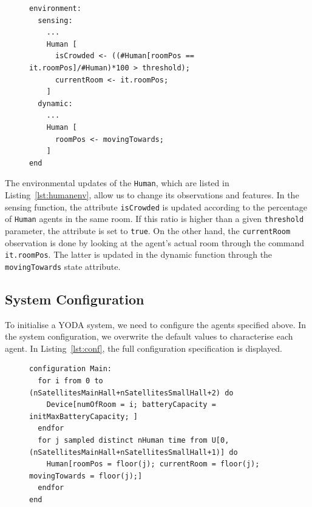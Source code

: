 \documentclass[runningheads]{llncs}
\newcommand{\yoda}{\textsf{YODA}}
\begin{document}
\begin{figure}[htbp!]
\begin{lstlisting}[language=yoda,basicstyle=\scriptsize, caption={IAQ Scenario: \textsf{Human} Sensing and Dynamic Functions}, label={lst:humanenv}]
environment:
  sensing:
    ...
    Human [
      isCrowded <- ((#Human[roomPos == it.roomPos]/#Human)*100 > threshold);
      currentRoom <- it.roomPos;
    ]
  dynamic:
    ...
    Human [
      roomPos <- movingTowards;
    ]
end
\end{lstlisting}
\end{figure}

The environmental updates of the \lstinline{Human}, which are listed in Listing~\ref{lst:humanenv}, allow us to change its observations and features.
%
In the sensing function, the attribute \lstinline{isCrowded} is updated according to the percentage of \lstinline{Human} agents in the same room. If this ratio is higher than a given \lstinline{threshold} parameter, the attribute is set to \lstinline{true}.
%
On the other hand, the \lstinline{currentRoom} observation is done by looking at the agent's actual room through the command \lstinline{it.roomPos}.
%
The latter is updated in the dynamic function through the \lstinline{movingTowards} state attribute.

\subsection{System Configuration}\label{subsec:sysconf}

To initialise a \yoda{} system, we need to configure the agents specified above.
%
In the system configuration, we overwrite the default values to characterise each agent.
%
In Listing~\ref{lst:conf}, the full configuration specification is displayed.

\begin{figure}[htbp!]
\begin{lstlisting}[language=yoda,basicstyle=\scriptsize, caption={IAQ Scenario: Configuration}, label={lst:conf}]
configuration Main:
  for i from 0 to (nSatellitesMainHall+nSatellitesSmallHall+2) do
    Device[numOfRoom = i; batteryCapacity = initMaxBatteryCapacity; ]
  endfor
  for j sampled distinct nHuman time from U[0, (nSatellitesMainHall+nSatellitesSmallHall+1)] do
    Human[roomPos = floor(j); currentRoom = floor(j); movingTowards = floor(j);]
  endfor
end
\end{lstlisting}
\end{figure}
\end{document}
